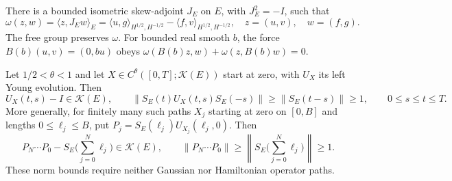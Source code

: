 \begin{lemma}
  \label{L:symplectic-free}
  There is a bounded isometric skew-adjoint $J_E$ on $E$, with $J_E^2 = -I$,
  such that
  \[
    \omega(z,w)=\langle z,J_Ew\rangle_E
    =\langle u,g\rangle_{H^{1/2},H^{-1/2}}
    -\langle f,v\rangle_{H^{1/2},H^{-1/2}},
    \quad z=(u,v),\quad w=(f,g).
  \]
  The free group preserves $\omega$. For bounded real smooth $b$, the force
  $B(b)(u,v) = (0,bu)$ obeys $\omega(B(b)z,w)+\omega(z,B(b)w) = 0$.

  Let $1/2 < \theta < 1$ and let $X \in C^\theta([0,T];\mathcal{K}(E))$ start at
  zero, with $U_X$ its left Young evolution. Then
  \begin{equation}\label{E:symplectic-compact-young-baseline}
    U_X(t,s)-I\in\mathcal{K}(E),\qquad
    \|S_E(t)U_X(t,s)S_E(-s)\|
    \ge\|S_E(t-s)\|\ge1,\qquad 0\le s\le t\le T .
  \end{equation}
  More generally, for finitely many such paths $X_j$ starting at zero on $[0,B]$
  and lengths $0 \le \ell_j \le B$, put $P_j = S_E(\ell_j)U_{X_j}(\ell_j,0)$.
  Then
  \begin{equation}\label{E:symplectic-compact-product-baseline}
    P_N\cdots P_0-S_E\Big(\sum_{j=0}^N\ell_j\Big)\in\mathcal{K}(E),
    \qquad
    \|P_N\cdots P_0\|
    \ge\left\|S_E\Big(\sum_{j=0}^N\ell_j\Big)\right\|\ge1 .
  \end{equation}
  These norm bounds require neither Gaussian nor Hamiltonian operator paths.
\end{lemma}

